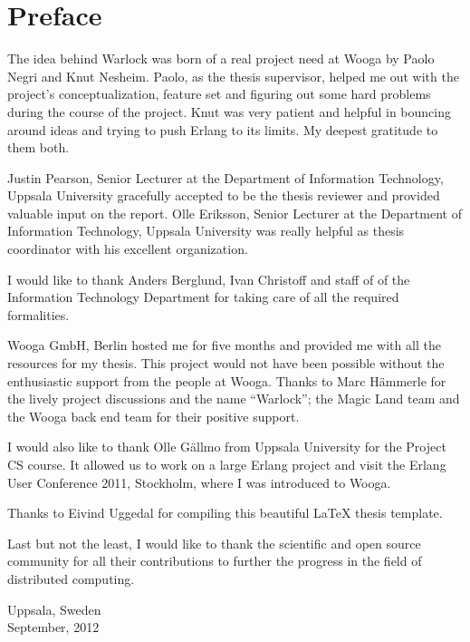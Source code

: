 \chapter{Preface}

The idea behind Warlock was born of a real project need at Wooga by Paolo Negri
and Knut Nesheim. Paolo, as the thesis supervisor, helped me out with the
project's conceptualization, feature set and figuring out some hard problems
during the course of the project. Knut was very patient and helpful in bouncing
around ideas and trying to push Erlang to its limits. My deepest gratitude to 
them both.

Justin Pearson, Senior Lecturer at the Department of Information Technology,
Uppsala University gracefully accepted to be the thesis reviewer and provided
valuable input on the report. Olle Eriksson, Senior Lecturer at the Department
of Information Technology, Uppsala University was really helpful as thesis
coordinator with his excellent organization.

I would like to thank Anders Berglund, Ivan Christoff and staff of 
of the Information Technology Department for taking care of all the required 
formalities.

Wooga GmbH, Berlin hosted me for five months and provided me with all the 
resources for my thesis. This project would not have 
been possible without the enthusiastic support from the people 
at Wooga. Thanks to Marc Hämmerle for the lively project discussions and the
name ``Warlock''; the Magic Land team and the Wooga back end team for their
positive support.

I would also like to thank Olle Gällmo from Uppsala University for the
Project CS course. It allowed us to work on a large Erlang project and
visit the Erlang User Conference 2011, Stockholm, where I was
introduced to Wooga.

Thanks to Eivind Uggedal for compiling this beautiful {\LaTeX} thesis template.

Last but not the least, I would like to thank the scientific and open
source community for all their contributions to further the progress in the
field of distributed computing.\\


\raggedright{Uppsala, Sweden \\
September, 2012}


